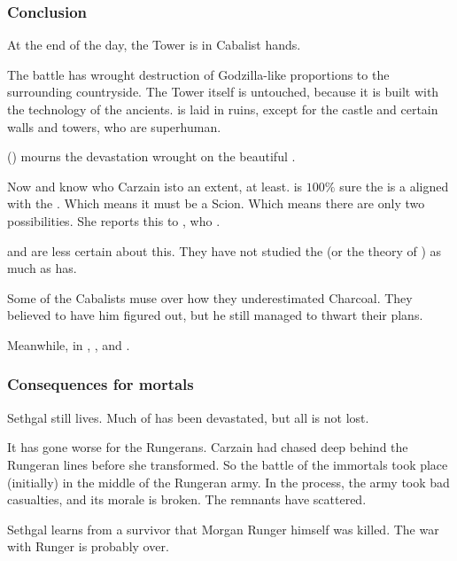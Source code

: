 \subsubsection{Conclusion}
At the end of the day, the Tower is in Cabalist hands. 

The battle has wrought destruction of Godzilla-like proportions to the surrounding countryside. The Tower itself is untouched, because it is built with the technology of the ancients. \Forclin{} is laid in ruins, except for the castle and certain walls and towers, who are superhuman. 

\Nzessuacrith{} () mourns the devastation wrought on the beautiful \Forclin. 

Now \Achsah{} and \Nzessuacrith{} know who Carzain is\dash to an extent, at least.
\Achsah{} is $100\%$ sure the \vertex{} is a \sathariah{} aligned with the . 
Which means it must be a Scion. 
Which means there are only two possibilities. 
She reports this to \Azraid, who . 

\Nzessuacrith{} and \Ishnaruchaefir{} are less certain about this. 
They have not studied the \vertex{} (or the theory of \malachim) as much as \Achsah{} has. 

Some of the Cabalists muse over how they underestimated Charcoal. 
They believed to have him figured out, but he still managed to thwart their plans. 

Meanwhile, in \Malcur, , and .





\subsubsection{Consequences for mortals}
Sethgal still lives. 
Much of \Forclin has been devastated, but all is not lost. 

It has gone worse for the Rungerans. 
Carzain had chased \Takestsha deep behind the Rungeran lines before she transformed.
So the battle of the immortals took place (initially) in the middle of the Rungeran army. 
In the process, the army took bad casualties, and its morale is broken. 
The remnants have scattered. 

Sethgal learns from a survivor that Morgan Runger himself was killed. 
The war with Runger is probably over. 

